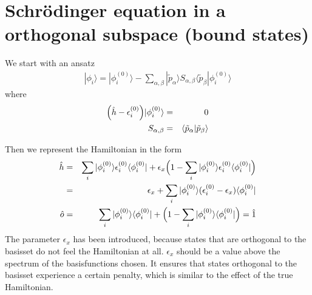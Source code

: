\documentclass[11pt,a4paper]{report}
\begin{document}
\section{Schr\"odinger equation in a orthogonal subspace (bound states)}
\label{app:schrorthobound}

We start with an ansatz
\begin{eqnarray}
|\phi_i\rangle=|\phi^{(0)}_i\rangle-\sum_{\alpha,\beta}|\tilde{p}_\alpha\rangle
S_{\alpha,\beta}\langle\tilde{p}_\beta|\phi^{(0)}_i\rangle
\end{eqnarray}
where 
\begin{eqnarray}
\Bigl(\hat{h}-\epsilon_i^{(0)}\Bigr)|\phi^{(0)}_i\rangle&=&0
\\
S_{\alpha,\beta}&=&\langle\tilde{p}_\alpha|\tilde{p}_\beta\rangle
\end{eqnarray}

Then we represent the Hamiltonian in the form
\begin{eqnarray}
\hat{h}&=&
\sum_i|\phi_i^{(0)}\rangle\epsilon_i^{(0)}\langle\phi_i^{(0)}|
+\epsilon_x\Bigl(1-\sum_i|\phi_i^{(0)}\rangle\epsilon_i^{(0)}\langle\phi_i^{(0)}|\Bigr)
\nonumber\\
&=&\epsilon_x+\sum_i|\phi_i^{(0)}\rangle(\epsilon_i^{(0)}-\epsilon_x)
\langle\phi_i^{(0)}|
\\
\hat{o}&=&
\sum_i|\phi_i^{(0)}\rangle\langle\phi_i^{(0)}|
+\Bigl(1-\sum_i|\phi_i^{(0)}\rangle\langle\phi_i^{(0)}|\Bigr)
=\hat{1}
\end{eqnarray}
The parameter $\epsilon_x$ has been introduced, because states that
are orthogonal to the basisset do not feel the Hamiltonian at
all. $\epsilon_x$ should be a value above the spectrum of the
basisfunctions chosen. It ensures that states orthogonal to the
basisset experience a certain penalty, which is similar to the effect
of the true Hamiltonian.
\end{document}
